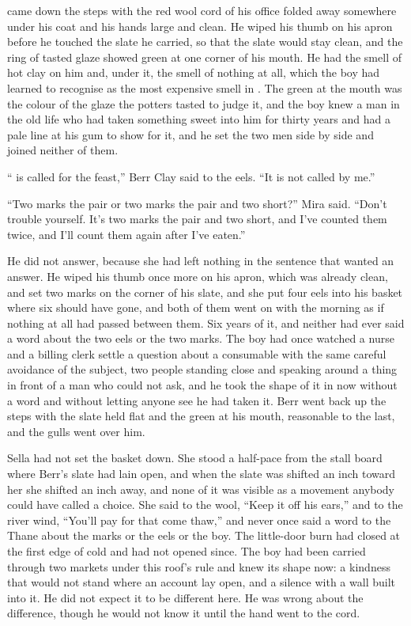 \scenebreak

 came down the steps with the red wool cord of his office folded away somewhere under his coat and his hands large and clean. He wiped his thumb on his apron before he touched the slate he carried, so that the slate would stay clean, and the ring of tasted glaze showed green at one corner of his mouth. He had the smell of hot clay on him and, under it, the smell of nothing at all, which the boy had learned to recognise as the most expensive smell in . The green at the mouth was the colour of the glaze the potters tasted to judge it, and the boy knew a man in the old life who had taken something sweet into him for thirty years and had a pale line at his gum to show for it, and he set the two men side by side and joined neither of them.

“ is called for the feast,” Berr Clay said to the eels. “It is not called by me.”

“Two marks the pair or two marks the pair and two short?” Mira said. “Don't trouble yourself. It's two marks the pair and two short, and I've counted them twice, and I'll count them again after I've eaten.”

He did not answer, because she had left nothing in the sentence that wanted an answer. He wiped his thumb once more on his apron, which was already clean, and set two marks on the corner of his slate, and she put four eels into his basket where six should have gone, and both of them went on with the morning as if nothing at all had passed between them. Six years of it, and neither had ever said a word about the two eels or the two marks. The boy had once watched a nurse and a billing clerk settle a question about a consumable with the same careful avoidance of the subject, two people standing close and speaking around a thing in front of a man who could not ask, and he took the shape of it in now without a word and without letting anyone see he had taken it. Berr went back up the steps with the slate held flat and the green at his mouth, reasonable to the last, and the gulls went over him.

Sella had not set the basket down. She stood a half-pace from the stall board where Berr's slate had lain open, and when the slate was shifted an inch toward her she shifted an inch away, and none of it was visible as a movement anybody could have called a choice. She said to the wool, “Keep it off his ears,” and to the river wind, “You'll pay for that come thaw,” and never once said a word to the Thane about the marks or the eels or the boy. The little-door burn had closed at the first edge of cold and had not opened since. The boy had been carried through two markets under this roof's rule and knew its shape now: a kindness that would not stand where an account lay open, and a silence with a wall built into it. He did not expect it to be different here. He was wrong about the difference, though he would not know it until the hand went to the cord.

